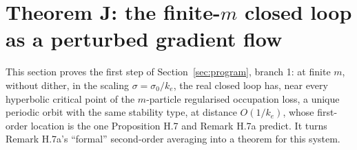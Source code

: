 \section{Theorem J: the finite-$m$ closed loop as a perturbed gradient flow}\label{sec:thmJ}

This section proves the first step of Section~\ref{sec:program}, branch 1: at finite $m$, without dither, in the
scaling $\sigma = \sigma_0/k_e$, the real closed loop has, near every hyperbolic critical point of the $m$-particle
regularised occupation loss, a unique periodic orbit with the same stability type, at distance $O(1/k_e)$, whose
first-order location is the one Proposition H.7 and Remark H.7a predict. It turns Remark H.7a's ``formal''
second-order averaging into a theorem for this system.

